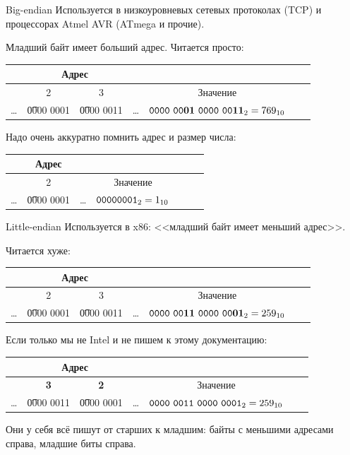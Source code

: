 \begin{frame}{Big-endian}
	Используется в низкоуровневых сетевых протоколах (TCP) и процессорах Atmel AVR (ATmega и прочие).

	Младший байт имеет больший адрес.
	Читается просто:
	\begin{center}
		\begin{tabular}{|c|c|c|c|c|c|c|}
			\hline
			\multicolumn{4}{|c|}{Адрес} & \\\hline
			& 2 & 3 & & Значение \\\hline
			\dots & \t{0000 0001} & \t{0000 0011} & \dots & $\t{0000~00\textbf{01}~0000~00\textbf{11}}_2=769_{10}$ \\\hline
		\end{tabular}
	\end{center}

	Надо очень аккуратно помнить адрес и размер числа:
	\begin{center}
		\begin{tabular}{|c|c|c|c|c|c|c|}
			\hline
			\multicolumn{3}{|c|}{Адрес} & \\\hline
			& 2 & & Значение \\\hline
			\dots & \t{0000 0001} & \dots & $\t{0000 0001}_2=1_{10}$ \\\hline
		\end{tabular}
	\end{center}
\end{frame}

\begin{frame}{Little-endian}
	Используется в x86: <<младший байт имеет меньший адрес>>.

	Читается хуже:
	\begin{center}
		\begin{tabular}{|c|c|c|c|c|c|c|}
			\hline
			\multicolumn{4}{|c|}{Адрес} & \\\hline
			& 2 & 3 & & Значение \\\hline
			\dots & \t{0000 0001} & \t{0000 0011} & \dots & $\t{0000~00\textbf{11}~0000~00\textbf{01}}_2=259_{10}$ \\\hline
		\end{tabular}
	\end{center}
	Если только мы не Intel и не пишем к этому документацию:
	\begin{center}
		\begin{tabular}{|c|c|c|c|c|c|c|}
			\hline
			\multicolumn{4}{|c|}{Адрес} & \\\hline
			& \textbf{3} & \textbf{2} & & Значение \\\hline
			\dots & \t{0000 0011} & \t{0000 0001} & \dots & $\t{0000~0011~0000~0001}_2=259_{10}$ \\\hline
		\end{tabular}
	\end{center}
	Они у себя всё пишут от старших к младшим: байты с меньшими адресами справа, младшие биты справа.
\end{frame}

